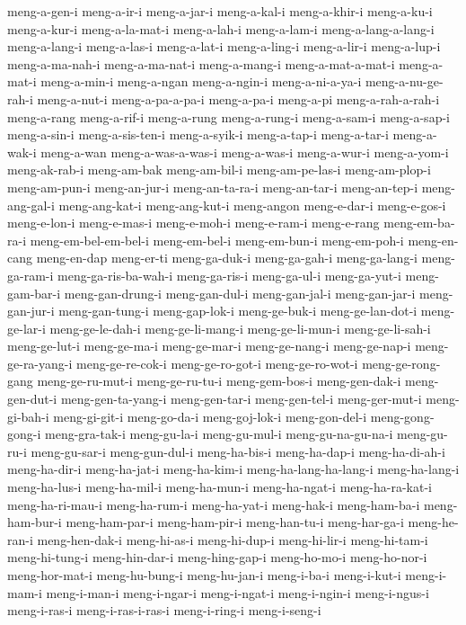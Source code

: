 {meng-a-gen-i meng-a-ir-i meng-a-jar-i meng-a-kal-i meng-a-khir-i
meng-a-ku-i meng-a-kur-i meng-a-la-mat-i meng-a-lah-i meng-a-lam-i
meng-a-lang-a-lang-i meng-a-lang-i meng-a-las-i meng-a-lat-i meng-a-ling-i
meng-a-lir-i meng-a-lup-i meng-a-ma-nah-i meng-a-ma-nat-i meng-a-mang-i
meng-a-mat-a-mat-i meng-a-mat-i meng-a-min-i meng-a-ngan meng-a-ngin-i
meng-a-ni-a-ya-i meng-a-nu-ge-rah-i meng-a-nut-i meng-a-pa-a-pa-i
meng-a-pa-i meng-a-pi meng-a-rah-a-rah-i meng-a-rang meng-a-rif-i
meng-a-rung meng-a-rung-i meng-a-sam-i meng-a-sap-i meng-a-sin-i
meng-a-sis-ten-i meng-a-syik-i meng-a-tap-i meng-a-tar-i meng-a-wak-i
meng-a-wan meng-a-was-a-was-i meng-a-was-i meng-a-wur-i meng-a-yom-i
meng-ak-rab-i meng-am-bak meng-am-bil-i meng-am-pe-las-i meng-am-plop-i
meng-am-pun-i meng-an-jur-i meng-an-ta-ra-i meng-an-tar-i meng-an-tep-i
meng-ang-gal-i meng-ang-kat-i meng-ang-kut-i meng-angon meng-e-dar-i
meng-e-gos-i meng-e-lon-i meng-e-mas-i meng-e-moh-i meng-e-ram-i
meng-e-rang meng-em-ba-ra-i meng-em-bel-em-bel-i meng-em-bel-i
meng-em-bun-i meng-em-poh-i meng-en-cang meng-en-dap meng-er-ti
meng-ga-duk-i meng-ga-gah-i meng-ga-lang-i meng-ga-ram-i
meng-ga-ris-ba-wah-i meng-ga-ris-i meng-ga-ul-i meng-ga-yut-i
meng-gam-bar-i meng-gan-drung-i meng-gan-dul-i meng-gan-jal-i
meng-gan-jar-i meng-gan-jur-i meng-gan-tung-i meng-gap-lok-i meng-ge-buk-i
meng-ge-lan-dot-i meng-ge-lar-i meng-ge-le-dah-i meng-ge-li-mang-i
meng-ge-li-mun-i meng-ge-li-sah-i meng-ge-lut-i meng-ge-ma-i meng-ge-mar-i
meng-ge-nang-i meng-ge-nap-i meng-ge-ra-yang-i meng-ge-re-cok-i
meng-ge-ro-got-i meng-ge-ro-wot-i meng-ge-rong-gang meng-ge-ru-mut-i
meng-ge-ru-tu-i meng-gem-bos-i meng-gen-dak-i meng-gen-dut-i
meng-gen-ta-yang-i meng-gen-tar-i meng-gen-tel-i meng-ger-mut-i
meng-gi-bah-i meng-gi-git-i meng-go-da-i meng-goj-lok-i meng-gon-del-i
meng-gong-gong-i meng-gra-tak-i meng-gu-la-i meng-gu-mul-i
meng-gu-na-gu-na-i meng-gu-ru-i meng-gu-sar-i meng-gun-dul-i meng-ha-bis-i
meng-ha-dap-i meng-ha-di-ah-i meng-ha-dir-i meng-ha-jat-i meng-ha-kim-i
meng-ha-lang-ha-lang-i meng-ha-lang-i meng-ha-lus-i meng-ha-mil-i
meng-ha-mun-i meng-ha-ngat-i meng-ha-ra-kat-i meng-ha-ri-mau-i
meng-ha-rum-i meng-ha-yat-i meng-hak-i meng-ham-ba-i meng-ham-bur-i
meng-ham-par-i meng-ham-pir-i meng-han-tu-i meng-har-ga-i meng-he-ran-i
meng-hen-dak-i meng-hi-as-i meng-hi-dup-i meng-hi-lir-i meng-hi-tam-i
meng-hi-tung-i meng-hin-dar-i meng-hing-gap-i meng-ho-mo-i meng-ho-nor-i
meng-hor-mat-i meng-hu-bung-i meng-hu-jan-i meng-i-ba-i meng-i-kut-i
meng-i-mam-i meng-i-man-i meng-i-ngar-i meng-i-ngat-i meng-i-ngin-i
meng-i-ngus-i meng-i-ras-i meng-i-ras-i-ras-i meng-i-ring-i meng-i-seng-i
}
